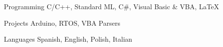 

\begin{cvskills}


  \cvskill
    {Programming} %
    {C/C++, Standard ML, C\#, Visual Basic \& VBA, LaTeX} %

  \cvskill
    {Projects} %
    {Arduino, RTOS, VBA Parsers} %

  \cvskill
    {Languages} %
    {Spanish, English, Polish, Italian} %

\end{cvskills}
